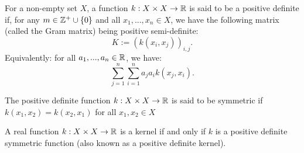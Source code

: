 \documentclass[english]{article}
\begin{document}
\begin{defn}
	For a non-empty set $X$, a function $k: X \times X \rightarrow \mathbb{R}$ is said to be a positive definite if, for any $m \in \mathbb{Z}^+ \cup \{0\}$ and all $x_1, ..., x_n \in X$, we have the following matrix (called the Gram matrix) being positive semi-definite:
	\[ K := (k(x_i, x_j))_{i,j}. \]
	Equivalently: for all $a_1, ..., a_n \in \mathbb{R}$, we have:
	\[ \sum_{j=1}^{n} \sum_{i=1}^{n} a_j a_i k(x_j, x_i). \]
\end{defn}
\begin{defn}
	The positive definite function $k: X \times X \rightarrow \mathbb{R}$ is said to be symmetric if  $k(x_1, x_2) = k(x_2, x_1)$ for all $x_1, x_2 \in X$
\end{defn}
\begin{thm}
	A real function $k:X \times X \rightarrow \mathbb{R}$ is a kernel if and only if $k$ is a positive definite symmetric function (also known as a positive definite kernel).
\end{thm}
\end{document}
